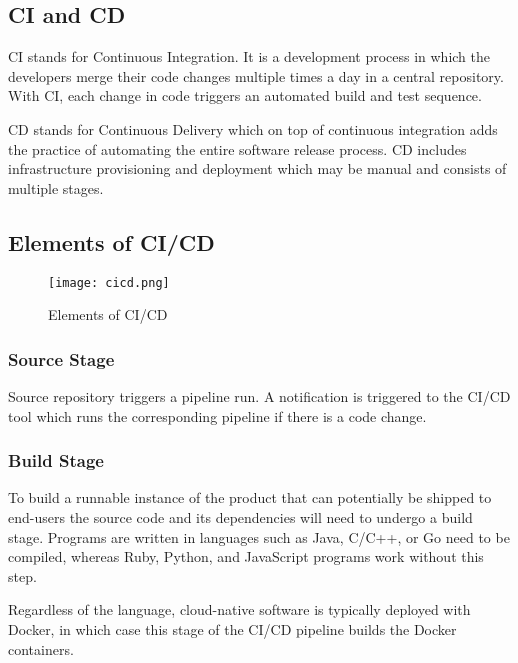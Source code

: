 \subsection{CI and CD}

CI stands for Continuous Integration. It is a development process in which the developers merge
their code changes multiple times a day in a central repository. With CI, each change in code triggers an automated build and test sequence.

CD stands for Continuous Delivery which on top of continuous integration adds the practice of automating the entire software release process. CD includes infrastructure provisioning and deployment which may be manual and consists of multiple stages.~\cite{CICD}

\subsection{Elements of CI/CD}

\begin{figure}[h!]
    \begin{center}
        \texttt{[image: cicd.png]}
    \end{center}
    \caption{Elements of CI/CD}
    \label{fig:cicd}
\end{figure}

\subsubsection{Source Stage}

Source repository triggers a pipeline run. A notification is triggered to the CI/CD tool 
which runs the corresponding pipeline if there is a code change. 

\subsubsection{Build Stage}

To build a runnable instance of the product that can potentially be shipped to end-users  
the source code and its dependencies will need to undergo a build stage. 
Programs are written in languages such as Java, C/C++, or Go need 
to be compiled, whereas Ruby, Python, and JavaScript programs work without this step.

Regardless of the language, cloud-native software is typically deployed with Docker, in which case this 
stage of the CI/CD pipeline builds the Docker containers.

